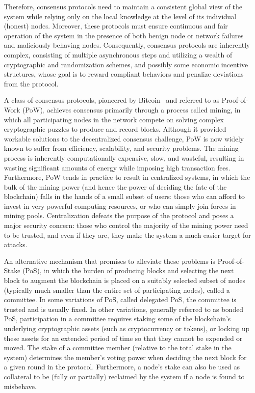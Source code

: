 Therefore, consensus protocols need to maintain a consistent global view of the system while relying only on the local knowledge at the level of its individual (honest) nodes. Moreover, these protocols must ensure continuous and fair operation of the system in the presence of both benign node or network failures and maliciously behaving nodes. Consequently, consensus protocols are inherently complex, consisting of multiple asynchronous steps and utilizing a wealth of cryptographic and randomization schemes, and possibly some economic incentive structures, whose goal is to reward compliant behaviors and penalize deviations from the protocol.

A class of consensus protocols, pioneered by Bitcoin~\cite{Nakamoto2008} and referred to as Proof-of-Work (PoW), achieves consensus primarily through a process called mining, in which all participating nodes in the network compete on solving complex cryptographic puzzles to produce and record blocks. Although it provided workable solutions to the decentralized consensus challenge, PoW is now widely known to suffer from efficiency, scalability, and security problems. The mining process is inherently computationally expensive, slow, and wasteful, resulting in wasting significant amounts of energy while imposing high transaction fees. Furthermore, PoW tends in practice to result in centralized systems, in which the bulk of the mining power (and hence the power of deciding the fate of the blockchain) falls in the hands of a small subset of users: those who can afford to invest in very powerful computing resources, or who can simply join forces in mining pools. Centralization defeats the purpose of the protocol and poses a major security concern: those who control the majority of the mining power need to be trusted, and even if they are, they make the system a much easier target for attacks.

An alternative mechanism that promises to alleviate these problems is Proof-of-Stake (PoS), in which the burden of producing blocks and selecting the next block to augment the blockchain is placed on a suitably selected subset of nodes (typically much smaller than the entire set of participating nodes), called a committee. In some variations of PoS, called delegated PoS, the committee is trusted and is usually fixed. In other variations, generally referred to as bonded PoS, participation in a committee requires staking some of the blockchain's underlying cryptographic assets (such as cryptocurrency or tokens), or locking up these assets for an extended period of time so that they cannot be expended or moved. The stake of a committee member (relative to the total stake in the system) determines the member's voting power when deciding the next block for a given round in the protocol. Furthermore, a node's stake can also be used as collateral to be (fully or partially) reclaimed by the system if a node is found to misbehave.

